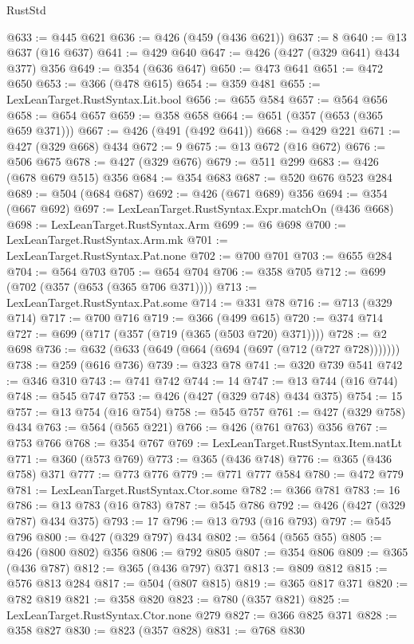 \begin{lexlean}{RustStd}
\begin{coremodule}
@633 := @445 @621
@636 := @426 (@459 (@436 @621))
@637 := 8
@640 := @13 @637 (@16 @637)
@641 := @429 @640
@647 := @426 (@427 (@329 @641) @434 @377) @356
@649 := @354 (@636 @647)
@650 := @473 @641
@651 := @472 @650
@653 := @366 (@478 @615)
@654 := @359 @481
@655 := LexLeanTarget.RustSyntax.Lit.bool
@656 := @655 @584
@657 := @564 @656
@658 := @654 @657
@659 := @358 @658
@664 := @651 (@357 (@653 (@365 @659 @371)))
@667 := @426 (@491 (@492 @641))
@668 := @429 @221
@671 := @427 (@329 @668) @434
@672 := 9
@675 := @13 @672 (@16 @672)
@676 := @506 @675
@678 := @427 (@329 @676)
@679 := @511 @299
@683 := @426 (@678 @679 @515) @356
@684 := @354 @683
@687 := @520 @676 @523 @284
@689 := @504 (@684 @687)
@692 := @426 (@671 @689) @356
@694 := @354 (@667 @692)
@697 := LexLeanTarget.RustSyntax.Expr.matchOn (@436 @668)
@698 := LexLeanTarget.RustSyntax.Arm
@699 := @6 @698
@700 := LexLeanTarget.RustSyntax.Arm.mk
@701 := LexLeanTarget.RustSyntax.Pat.none
@702 := @700 @701
@703 := @655 @284
@704 := @564 @703
@705 := @654 @704
@706 := @358 @705
@712 := @699 (@702 (@357 (@653 (@365 @706 @371))))
@713 := LexLeanTarget.RustSyntax.Pat.some
@714 := @331 @78
@716 := @713 (@329 @714)
@717 := @700 @716
@719 := @366 (@499 @615)
@720 := @374 @714
@727 := @699 (@717 (@357 (@719 (@365 (@503 @720) @371))))
@728 := @2 @698
@736 := @632 (@633 (@649 (@664 (@694 (@697 (@712 (@727 @728)))))))
@738 := @259 (@616 @736)
@739 := @323 @78
@741 := @320 @739 @541
@742 := @346 @310
@743 := @741 @742
@744 := 14
@747 := @13 @744 (@16 @744)
@748 := @545 @747
@753 := @426 (@427 (@329 @748) @434 @375)
@754 := 15
@757 := @13 @754 (@16 @754)
@758 := @545 @757
@761 := @427 (@329 @758) @434
@763 := @564 (@565 @221)
@766 := @426 (@761 @763) @356
@767 := @753 @766
@768 := @354 @767
@769 := LexLeanTarget.RustSyntax.Item.natLt
@771 := @360 (@573 @769)
@773 := @365 (@436 @748)
@776 := @365 (@436 @758) @371
@777 := @773 @776
@779 := @771 @777 @584
@780 := @472 @779
@781 := LexLeanTarget.RustSyntax.Ctor.some
@782 := @366 @781
@783 := 16
@786 := @13 @783 (@16 @783)
@787 := @545 @786
@792 := @426 (@427 (@329 @787) @434 @375)
@793 := 17
@796 := @13 @793 (@16 @793)
@797 := @545 @796
@800 := @427 (@329 @797) @434
@802 := @564 (@565 @55)
@805 := @426 (@800 @802) @356
@806 := @792 @805
@807 := @354 @806
@809 := @365 (@436 @787)
@812 := @365 (@436 @797) @371
@813 := @809 @812
@815 := @576 @813 @284
@817 := @504 (@807 @815)
@819 := @365 @817 @371
@820 := @782 @819
@821 := @358 @820
@823 := @780 (@357 @821)
@825 := LexLeanTarget.RustSyntax.Ctor.none @279
@827 := @366 @825 @371
@828 := @358 @827
@830 := @823 (@357 @828)
@831 := @768 @830

\end{coremodule}
\end{lexlean}
